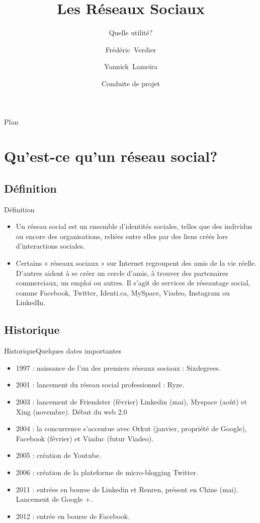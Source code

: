 \documentclass{beamer}
\title[Réseaux Sociaux]
{Les Réseaux Sociaux}
\subtitle
{Quelle utilité?}
\author[Verdier, Lameira]{Frédéric~Verdier\and Yannick~Lameira}
\institute[Université Montpellier 2]
{Licence 3 Informatique}
\date[2012] 
{Conduite de projet}
\begin{document}
\begin{frame}
  \titlepage
\end{frame}
\begin{frame}{Plan}
  \tableofcontents
\end{frame}
\section{Qu'est-ce qu'un réseau social?}
\subsection{Définition}
\begin{frame}{Définition}
  \begin{itemize}
  \item
    Un réseau social est un ensemble d'identités sociales, telles que des individus ou encore des organisations, reliées entre elles par des liens créés lors d'interactions sociales.
  \item
    Certains « réseaux sociaux » sur Internet regroupent des amis de la vie réelle. D'autres aident à se créer un cercle d'amis, à trouver des partenaires commerciaux, un emploi ou autres. Il s'agit de services de réseautage social, comme Facebook, Twitter, Identi.ca, MySpace, Viadeo, Instagram ou LinkedIn.
  \end{itemize}
\end{frame}
\subsection{Historique}
\begin{frame}{Historique}{Quelques dates importantes}
	\begin{itemize}
		\item 1997 : naissance de l'un des premiers réseaux sociaux : Sixdegrees.
		\item 2001 : lancement du réseau social professionnel : Ryze.
		\item 2003 : lancement de Friendster (février) Linkedin (mai), Myspace (août) et Xing (novembre). Début du web 2.0
		\item 2004 : la concurrence s'accentue avec Orkut (janvier, propriété de Google), Facebook (février) et Viaduc (futur Viadeo).
		\item 2005 : création de Youtube.
		\item 2006 : création de la plateforme de micro-blogging Twitter.
		\item 2011 : entrées en bourse de Linkedin et Renren, présent en Chine (mai). Lancement de Google +.
		\item 2012 : entrée en bourse de Facebook.
	\end{itemize}
\end{frame}
\end{document}
